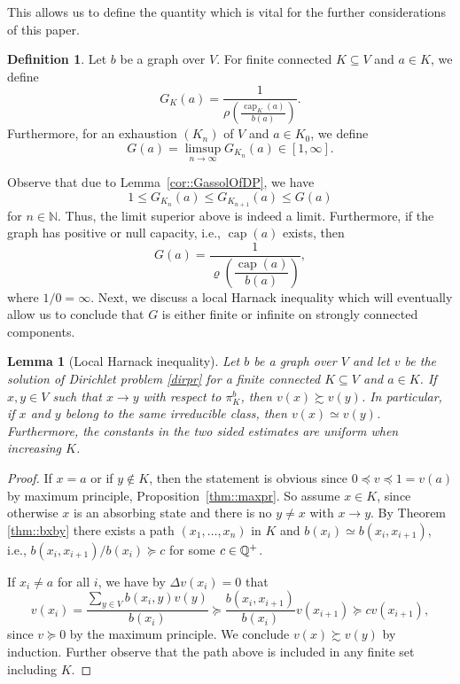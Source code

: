 \documentclass[a4paper,oneside, 12pt]{amsart}
\numberwithin{theorem}{section}
\newtheorem{lemma}[theorem]{Lemma}
\theoremstyle{definition}
\newtheorem{definition}[theorem]{Definition}
\renewcommand{\c}{\operatorname{cap}}
\newcommand{\G}{{G}}
\newcommand{\map}{\varrho}
\begin{document}
{This allows us to define the quantity which is vital for the further considerations of this paper. 


\begin{definition}
Let $b$ be a  graph over $V$. For finite connected $K\subseteq V$ and $a\in K$, we define
$$
\G_K(a)=\dfrac{1}{\displaystyle\rho\left(\frac{\c_K(a)}{b(a)}\right)}.
$$
Furthermore, for an exhaustion $ (K_{n}) $ of $ V $ and $ a\in K_{0} $, we define
$$
\G(a)=\limsup_{n\to\infty}\G_{K_n}(a)\in [1,\infty].
$$
\end{definition}
Observe that due to Lemma~\ref{cor::GassolOfDP}, we have $$  1\leq\G_{K_{n}}(a)\leq \G_{K_{n+1}}(a)\leq \G(a) $$ for $ n\in \mathbb{N} $. Thus, the limit superior above is indeed a limit. Furthermore, if the graph has positive or null capacity, i.e., $ \c(a) $ exists, then
$$
\G(a)=\dfrac{1}{\map\left(\dfrac{\c(a)}{b(a)}\right)},
$$
where $ 1/0 = \infty$.  Next, we discuss a local Harnack inequality which will eventually allow us to conclude that $ \G $ is either finite or infinite on strongly connected components. 





\begin{lemma}[Local Harnack inequality]\label{lemma::Harnack}
Let $b$ be a  graph over $V$ and let $v$ be the solution of Dirichlet problem \eqref{dirpr} for a finite connected $K\subseteq V$ and $ a\in K $. If $x,y\in V$ such that $x\to y$ with respect to $ \pi_{K}^{b} $, then
 $v(x)\succsim v(y)$.  In particular, if $x$  and $y$ belong to the same irreducible class, then $v(x)\simeq v(y)$. Furthermore, the constants in the two sided  estimates are uniform when increasing $ K $. 
\end{lemma}

\begin{proof}
If $x=a$ or if $y\not\in K$, then the statement is obvious since $0\preceq v\preceq 1=v(a)$ by maximum principle, Proposition~\ref{thm::maxpr}. So assume $x\in K$, since otherwise  $x$ is an absorbing state and there is no  $y\ne x$ with $x\to y$.
By Theorem \ref{thm::bxby} there exists a path $(x_1,\ldots,x_{n})$  in  $ K$ and $b(x_i)\simeq b(x_i,x_{i+1})$, i.e., ${b(x_i,x_{i+1})}/{b(x_i)}\succeq c$ for some $c\in \Bbb Q^+$. 

If $x_i\ne a$ for all $i$, we have by $\Delta v(x_i)=0$ that
$$
v(x_i)=\dfrac{\sum_{y\in V} b(x_i,y)v(y)}{b(x_i)}\succeq \frac{b(x_i,x_{i+1}) }{b(x_i)}v(x_{i+1})\succeq c v(x_{i+1}),
$$
since $v\succeq 0$ by the maximum principle. We conclude  $v(x)\succsim v(y)$ by induction. Further observe that the path above is included in any finite set including $ K $.
 

\end{proof}}
\end{document}
